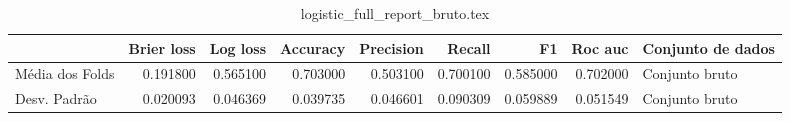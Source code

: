 \begin{table}
\centering
\caption{logistic_full_report_bruto.tex}
\label{logistic_full_report_bruto.tex}
\begin{tabular}{lrrrrrrrl}
\toprule
{} &  Brier  loss &  Log loss &  Accuracy  &  Precision  &   Recall  &       F1  &  Roc auc  & Conjunto de dados \\
\midrule
Média dos Folds &     0.191800 &  0.565100 &   0.703000 &    0.503100 &  0.700100 &  0.585000 &  0.702000 &    Conjunto bruto \\
Desv. Padrão    &     0.020093 &  0.046369 &   0.039735 &    0.046601 &  0.090309 &  0.059889 &  0.051549 &    Conjunto bruto \\
\bottomrule
\end{tabular}
\end{table}
